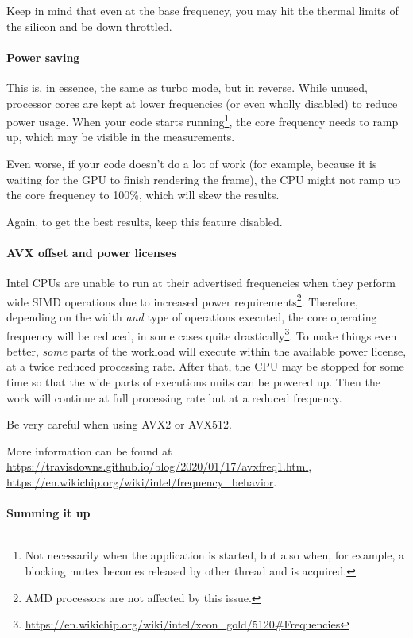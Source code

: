 \documentclass[hidelinks,titlepage,a4paper,twoside]{article}
\begin{document}
Keep in mind that even at the base frequency, you may hit the thermal limits of the silicon and be down throttled.

\paragraph{Power saving}

This is, in essence, the same as turbo mode, but in reverse. While unused, processor cores are kept at lower frequencies (or even wholly disabled) to reduce power usage. When your code starts running\footnote{Not necessarily when the application is started, but also when, for example, a blocking mutex becomes released by other thread and is acquired.}, the core frequency needs to ramp up, which may be visible in the measurements.

Even worse, if your code doesn't do a lot of work (for example, because it is waiting for the GPU to finish rendering the frame), the CPU might not ramp up the core frequency to 100\%, which will skew the results.

Again, to get the best results, keep this feature disabled.

\paragraph{AVX offset and power licenses}

Intel CPUs are unable to run at their advertised frequencies when they perform wide SIMD operations due to increased power requirements\footnote{AMD processors are not affected by this issue.}. Therefore, depending on the width \emph{and} type of operations executed, the core operating frequency will be reduced, in some cases quite drastically\footnote{\url{https://en.wikichip.org/wiki/intel/xeon_gold/5120\#Frequencies}}. To make things even better, \emph{some} parts of the workload will execute within the available power license, at a twice reduced processing rate. After that, the CPU may be stopped for some time so that the wide parts of executions units can be powered up. Then the work will continue at full processing rate but at a reduced frequency.

Be very careful when using AVX2 or AVX512.

More information can be found at \url{https://travisdowns.github.io/blog/2020/01/17/avxfreq1.html}, \url{https://en.wikichip.org/wiki/intel/frequency_behavior}.

\paragraph{Summing it up}
\label{ryzen}
\end{document}
